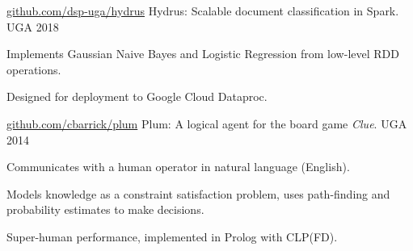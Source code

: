 \begin{cventries}

\cventry
{\textnormal{\url{github.com/dsp-uga/hydrus}}}
{Hydrus: Scalable document classification in Spark.}
{UGA}
{2018}
{\begin{cvitems}
    \item {Implements Gaussian Naive Bayes and Logistic Regression from low-level RDD operations.}
    \item {Designed for deployment to Google Cloud Dataproc.}
\end{cvitems}}

\cventry
{\textnormal{\url{github.com/cbarrick/plum}}}
{Plum: A logical agent for the board game \textit{Clue}.}
{UGA}
{2014}
{\begin{cvitems}
    \item {Communicates with a human operator in natural language (English).}
    \item {Models knowledge as a constraint satisfaction problem, uses path-finding and probability estimates to make decisions.}
    \item {Super-human performance, implemented in Prolog with CLP(FD).}
\end{cvitems}}

\end{cventries}
